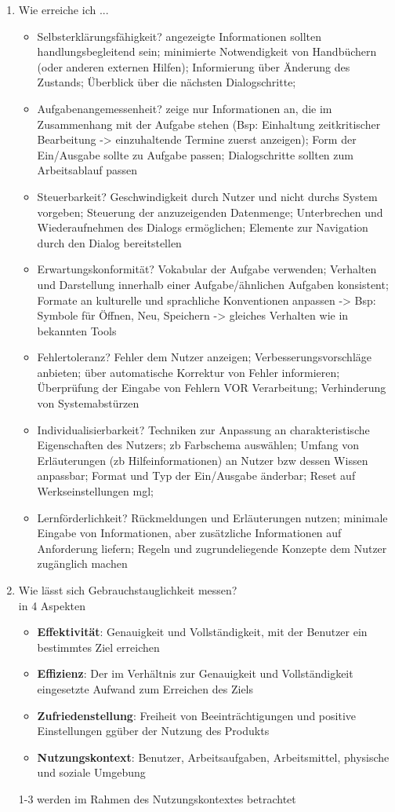 \begin{enumerate}
	\item Wie erreiche ich ...
	\begin{itemize}
		\item Selbsterklärungsfähigkeit? angezeigte Informationen sollten handlungsbegleitend sein; minimierte Notwendigkeit von Handbüchern (oder anderen externen Hilfen); Informierung über Änderung des Zustands; Überblick über die nächsten Dialogschritte; 
		\item Aufgabenangemessenheit? zeige nur Informationen an, die im Zusammenhang mit der Aufgabe stehen (Bsp: Einhaltung zeitkritischer Bearbeitung -> einzuhaltende Termine zuerst anzeigen); Form der Ein/Ausgabe sollte zu Aufgabe passen; Dialogschritte sollten zum Arbeitsablauf passen
		\item Steuerbarkeit? Geschwindigkeit durch Nutzer und nicht durchs System vorgeben; Steuerung der anzuzeigenden Datenmenge; Unterbrechen und Wiederaufnehmen des Dialogs ermöglichen; Elemente zur Navigation durch den Dialog bereitstellen 
		\item Erwartungskonformität? Vokabular der Aufgabe verwenden; Verhalten und Darstellung innerhalb einer Aufgabe/ähnlichen Aufgaben konsistent; Formate an kulturelle und sprachliche Konventionen anpassen -> Bsp: Symbole für Öffnen, Neu, Speichern -> gleiches Verhalten wie in bekannten Tools
		\item Fehlertoleranz? Fehler dem Nutzer anzeigen; Verbesserungsvorschläge anbieten; über automatische Korrektur von Fehler informieren; Überprüfung der Eingabe von Fehlern VOR Verarbeitung; Verhinderung von Systemabstürzen
		\item Individualisierbarkeit? Techniken zur Anpassung an charakteristische Eigenschaften des Nutzers; zb Farbschema auswählen; Umfang von Erläuterungen (zb Hilfeinformationen) an Nutzer bzw dessen Wissen anpassbar; Format und Typ der Ein/Ausgabe änderbar; Reset auf Werkseinstellungen mgl; 
		\item Lernförderlichkeit? Rückmeldungen und Erläuterungen nutzen; minimale Eingabe von Informationen, aber zusätzliche Informationen auf Anforderung liefern; Regeln und zugrundeliegende Konzepte dem Nutzer zugänglich machen
	\end{itemize}
	
	\item Wie lässt sich Gebrauchstauglichkeit messen?\\
	in 4 Aspekten
	\begin{itemize}
		\item \textbf{Effektivität}: Genauigkeit und Vollständigkeit, mit der Benutzer ein bestimmtes Ziel erreichen 
		\item \textbf{Effizienz}: Der im Verhältnis zur Genauigkeit und Vollständigkeit eingesetzte Aufwand zum Erreichen des Ziels
		\item \textbf{Zufriedenstellung}: Freiheit von Beeinträchtigungen und positive Einstellungen ggüber der Nutzung des Produkts
		\item \textbf{Nutzungskontext}: Benutzer, Arbeitsaufgaben, Arbeitsmittel, physische und soziale Umgebung
	\end{itemize}
	1-3 werden im Rahmen des Nutzungskontextes betrachtet
	

\end{enumerate}
